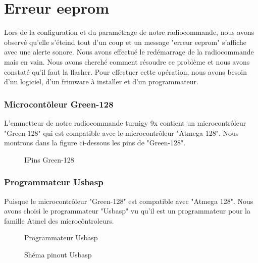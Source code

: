 \documentclass[a4paper,12pt]{book}
\begin{document}
\section{Erreur eeprom}
Lors de la configuration et du paramétrage de notre radiocommande, nous avons observé qu'elle s'éteind tout d'un coup et un message "erreur eeprom" s'affiche avec une alerte sonore. Nous avons effectué le redémarrage de la radiocommande mais en vain. Nous avons cherché comment résoudre ce problème et nous avons constaté qu'il faut la flasher. Pour effectuer cette opération, nous avons besoin d'un logiciel, d'un frimware à installer et d'un programmateur.
\subsubsection{Microcontôleur Green-128}
L'emmetteur de notre radiocommande turnigy 9x contient un microcontrôleur "Green-128" qui est compatible avec le microcontrôleur  "Atmega 128". Nous montrons dans la figure ci-dessous les pins de "Green-128". 
\begin{figure}[h]
	\begin{center}
		\centering
	\end{center}
	\caption{IPins Green-128}
\end{figure}
\subsubsection{Programmateur Usbasp}
Puisque le microcontrôleur "Green-128" est compatible avec "Atmega 128". Nous avons choisi le programmateur "Usbasp" vu qu'il est un programmateur pour la famille Atmel des microcôntroleurs. 

\begin{figure}[h]
	\begin{center}
		\begin{minipage}{0.49\textwidth}
			\centering
			\hspace*{-1.5cm}
			\centering
			\hspace*{-1cm}\caption{Programmateur Usbasp}
			\label{fig:my_label}
		\end{minipage}
		\begin{minipage}{0.49\textwidth}
			\centering
			\centering
			\hspace{1cm}\caption{Shéma pinout Usbasp}
			\label{fig:my_label}
		\end{minipage}
	\end{center}
\end{figure}
\end{document}
